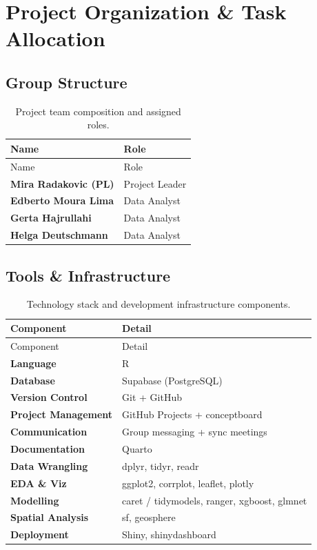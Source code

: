 \documentclass[
  english,
  letterpaper,
  DIV=11,
  numbers=noendperiod]{scrreprt}
\begin{document}

\chapter{Project Organization \& Task
Allocation}\label{project-organization-task-allocation}

\section{Group Structure}\label{group-structure}

\begin{longtable}[]{@{}ll@{}}
\caption{Project team composition and assigned
roles.}\label{tbl-team}\tabularnewline
\toprule\noalign{}
Name & Role \\
\midrule\noalign{}
\endfirsthead
\toprule\noalign{}
Name & Role \\
\midrule\noalign{}
\endhead
\bottomrule\noalign{}
\endlastfoot
\textbf{Mira Radakovic (PL)} & Project Leader \\
\textbf{Edberto Moura Lima} & Data Analyst \\
\textbf{Gerta Hajrullahi} & Data Analyst \\
\textbf{Helga Deutschmann} & Data Analyst \\
\end{longtable}

\section{Tools \& Infrastructure}\label{tools-infrastructure}

\begin{longtable}[]{@{}ll@{}}
\caption{Technology stack and development infrastructure
components.}\tabularnewline
\toprule\noalign{}
Component & Detail \\
\midrule\noalign{}
\endfirsthead
\toprule\noalign{}
Component & Detail \\
\midrule\noalign{}
\endhead
\bottomrule\noalign{}
\endlastfoot
\textbf{Language} & R \\
\textbf{Database} & Supabase (PostgreSQL) \\
\textbf{Version Control} & Git + GitHub \\
\textbf{Project Management} & GitHub Projects + conceptboard \\
\textbf{Communication} & Group messaging + sync meetings \\
\textbf{Documentation} & Quarto \\
\textbf{Data Wrangling} & dplyr, tidyr, readr \\
\textbf{EDA \& Viz} & ggplot2, corrplot, leaflet, plotly \\
\textbf{Modelling} & caret / tidymodels, ranger, xgboost, glmnet \\
\textbf{Spatial Analysis} & sf, geosphere \\
\textbf{Deployment} & Shiny, shinydashboard \\
\end{longtable}
\end{document}
